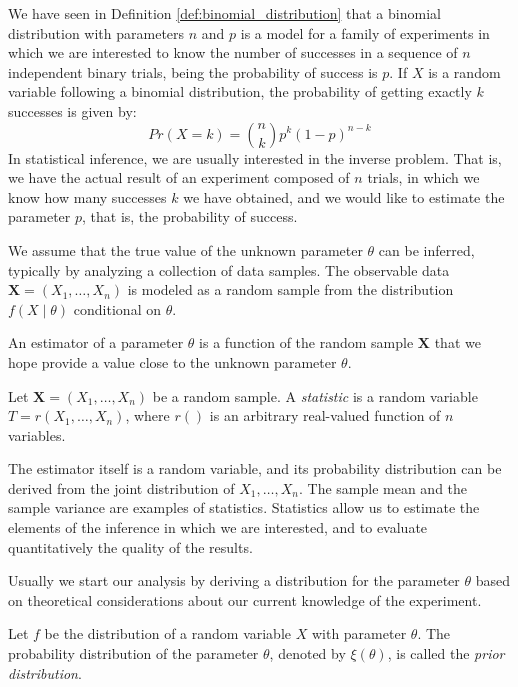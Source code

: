 \begin{example}
We have seen in Definition \ref{def:binomial_distribution} that a binomial distribution with parameters $n$ and $p$ is a model for a family of experiments in which we are interested to know the number of successes in a sequence of $n$ independent binary trials, being the probability of success is $p$. If $X$ is a random variable following a binomial distribution, the probability of getting exactly $k$ successes is given by:
\[
Pr(X=k) = {\binom {n}{k}}p^{k}(1-p)^{n-k}
\]
In statistical inference, we are usually interested in the inverse problem. That is, we have the actual result of an experiment composed of $n$ trials, in which we know how many successes $k$ we have obtained, and we would like to estimate the parameter $p$, that is, the probability of success.
\end {example}

We assume that the true value of the unknown parameter $\theta$ can be inferred, typically by analyzing a collection of data samples. The observable data $\mathbf{X}=\left(X_{1},\ldots,X_{n}\right)$ is modeled as a random sample from the distribution $f\left(X \mid \theta \right)$ conditional on $\theta$.

An estimator of a parameter $\theta$ is a function of the random sample $\mathbf{X}$ that we hope provide a value close to the unknown parameter $\theta$.

\begin{definition}
Let $\mathbf{X}=\left(X_{1},\ldots,X_{n}\right)$ be a random sample. A \emph{statistic} is a random variable $T = r \left( X_1, \ldots, X_n \right)$, where $r()$ is an arbitrary real-valued function of $n$ variables.
\end{definition}

The estimator itself is a random variable, and its probability distribution can be derived from the joint distribution of $X_1, \ldots, X_n$. The sample mean and the sample variance are examples of statistics. Statistics allow us to estimate the elements of the inference in which we are interested, and to evaluate quantitatively the quality of the results.

Usually we start our analysis by deriving a distribution for the parameter $\theta$ based on theoretical considerations about our current knowledge of the experiment.

\begin{definition}
Let $f$ be the distribution of a random variable $X$ with parameter $\theta$. The probability distribution of the parameter $\theta$, denoted by $\xi\left(\theta\right)$, is called the \emph{prior distribution}.
\end{definition}

